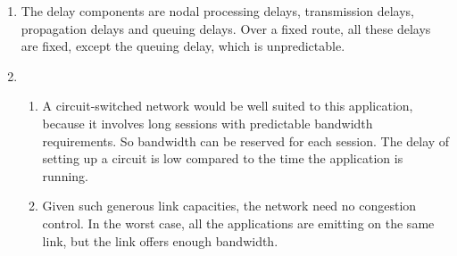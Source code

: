 \begin{enumerate}
  \item The delay components are nodal processing delays, transmission
    delays, propagation delays and queuing delays. Over a fixed route,
    all these delays are fixed, except the queuing delay, which is
    unpredictable.

  \item 
  \begin{enumerate}
 
    \item A circuit-switched network would be well suited to this
      application, because it involves long sessions with predictable
      bandwidth requirements. So bandwidth can be reserved for each
      session. The delay of setting up a circuit is low compared to
      the time the application is running.

    \item Given such generous link capacities, the network need no
    congestion control. In the worst case, all the applications are
    emitting on the same link, but the link offers enough bandwidth.

  \end{enumerate}

\end{enumerate}
